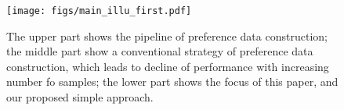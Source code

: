 \begin{figure}[!t]
\centering
\texttt{[image: figs/main\_illu\_first.pdf]}
\caption{The upper part shows the pipeline of preference data construction; the middle part show a conventional strategy of preference data construction, which leads to decline of performance with increasing number fo samples; the lower part shows the focus of this paper, and our proposed simple approach.}
\label{pipe}
\vspace{-1em}
\end{figure}